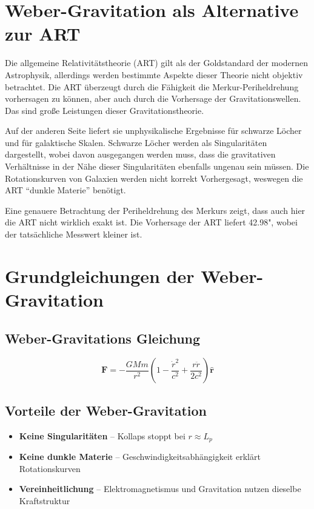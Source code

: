 \section{Weber-Gravitation als Alternative zur ART}
Die allgemeine Relativitätstheorie (ART) gilt als der Goldstandard der modernen Astrophysik, allerdings werden bestimmte Aspekte dieser Theorie
nicht objektiv betrachtet. Die ART überzeugt durch die Fähigkeit die Merkur-Periheldrehung vorhersagen zu können, aber auch durch die Vorhersage
der Gravitationswellen. Das sind große Leistungen dieser Gravitationstheorie.

Auf der anderen Seite liefert sie unphysikalische Ergebnisse für schwarze Löcher und für galaktische Skalen. Schwarze Löcher werden als Singularitäten
dargestellt, wobei davon ausgegangen werden muss, dass die gravitativen Verhältnisse in der Nähe dieser Singularitäten ebenfalls ungenau sein müssen. Die
Rotationskurven von Galaxien werden nicht korrekt Vorhergesagt, weswegen die ART \enquote{dunkle Materie} benötigt.

Eine genauere Betrachtung der Periheldrehung des Merkurs zeigt, dass auch hier die ART nicht wirklich exakt ist. Die Vorhersage der ART liefert 42.98", wobei
der tatsächliche Messwert kleiner ist.

\section{Grundgleichungen der Weber-Gravitation}
\subsection*{Weber-Gravitations Gleichung}
\begin{equation}\label{eq:weber_gravitationskraft}
\mathbf{F} = -\frac{GMm}{r^2}\left(1 - \frac{\dot{r}^2}{c^2} + \frac{r\ddot{r}}{2c^2}\right)\mathbf{\hat{r}}
\end{equation}

\subsection{Vorteile der Weber-Gravitation}
\begin{itemize}
\item \textbf{Keine Singularitäten} – Kollaps stoppt bei $r \approx L_p$
\item \textbf{Keine dunkle Materie} – Geschwindigkeitsabhängigkeit erklärt Rotationskurven
\item \textbf{Vereinheitlichung} – Elektromagnetismus und Gravitation nutzen dieselbe Kraftstruktur
\end{itemize}

